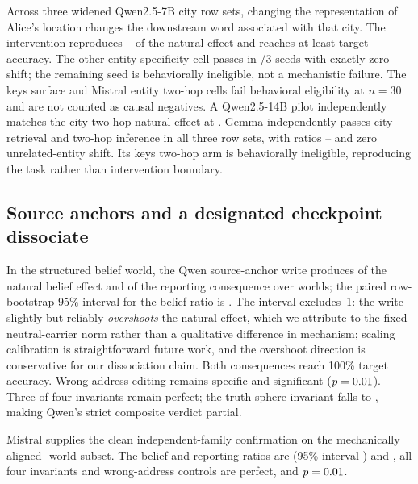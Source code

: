 \documentclass[10pt]{article}
\begin{document}
Across three widened Qwen2.5-7B city row sets, changing the representation of
Alice's location changes the downstream word associated with that city. The
intervention reproduces \ConfirmQwenCityTwoHopMin{}--
\ConfirmQwenCityTwoHopMax{} of the natural effect and reaches at least
\ConfirmQwenCityTwoHopAccMin{} target accuracy. The other-entity specificity
cell passes in \ConfirmQwenSpecificityPass{}/3 seeds with exactly zero shift;
the remaining seed is behaviorally ineligible, not a mechanistic failure. The
keys surface and Mistral entity two-hop cells fail behavioral eligibility at
$n=30$ and are not counted as causal negatives. A Qwen2.5-14B pilot independently
matches the city two-hop natural effect at \PilotCityTwoHopRatio{}. Gemma
independently passes city retrieval and two-hop inference in all three row
sets, with ratios \ConfirmGemmaCityTwoHopMin{}--
\ConfirmGemmaCityTwoHopMax{} and zero unrelated-entity shift. Its keys
two-hop arm is behaviorally ineligible, reproducing the task rather than
intervention boundary.

\subsection{Source anchors and a designated checkpoint dissociate}

In the structured belief world, the Qwen source-anchor write produces
\ConfirmQwenAnchorBelief{} of the natural belief effect and
\ConfirmQwenAnchorTell{} of the reporting consequence over
\ConfirmQwenAnchorN{} worlds; the paired row-bootstrap 95\% interval for the
belief ratio is \ConfirmQwenAnchorBeliefCI{}. The interval excludes~1: the
write slightly but reliably \emph{overshoots} the natural effect, which we
attribute to the fixed neutral-carrier norm rather than a qualitative
difference in mechanism; scaling calibration is straightforward future work,
and the overshoot direction is conservative for our dissociation claim. Both
consequences reach 100\% target accuracy. Wrong-address
editing remains specific and significant ($p=0.01$). Three of four
invariants remain perfect; the truth-sphere invariant falls to
\ConfirmQwenInvariantMin{}, making Qwen's strict composite verdict partial.

Mistral supplies the clean independent-family confirmation on the mechanically
aligned \ConfirmMistralAnchorN{}-world subset. The belief and reporting ratios
are \ConfirmMistralAnchorBelief{} (95\% interval
\ConfirmMistralAnchorBeliefCI{}) and \ConfirmMistralAnchorTell{}, all four
invariants and wrong-address controls are perfect, and $p=0.01$.
\end{document}
